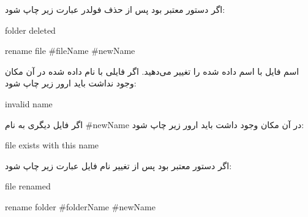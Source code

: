 \documentclass[]{article}
\begin{document}
اگر دستور معتبر بود پس از حذف فولدر عبارت زیر چاپ شود:

\begin{tcolorbox}[boxrule=0pt]
	\begin{latin}
  	  \large{
  	folder deleted
		}
	\end{latin}
\end{tcolorbox}







\begin{tcolorbox}[boxrule=0pt]
	\begin{latin}
  	  \large{
  	rename file \#fileName \#newName
		}
	\end{latin}
\end{tcolorbox}


اسم فایل با اسم داده شده را تغییر می‌دهید.
اگر فایلی با نام داده شده در آن مکان وجود نداشت باید ارور زیر چاپ شود:



\begin{tcolorbox}[boxrule=0pt]
	\begin{latin}
  	  \large{
  	invalid name
		}
	\end{latin}
\end{tcolorbox}



اگر فایل دیگری به نام \#newName در آن مکان وجود داشت باید ارور زیر چاپ شود:

\begin{tcolorbox}[boxrule=0pt]
	\begin{latin}
  	  \large{
  	file exists with this name
		}
	\end{latin}
\end{tcolorbox}



اگر دستور معتبر بود پس از تغییر نام فایل عبارت زیر چاپ شود:

\begin{tcolorbox}[boxrule=0pt]
	\begin{latin}
  	  \large{
  	file renamed
		}
	\end{latin}
\end{tcolorbox}


\begin{tcolorbox}[boxrule=0pt]
	\begin{latin}
  	  \large{
  	rename folder \#folderName \#newName
		}
	\end{latin}
\end{tcolorbox}
\end{document}
